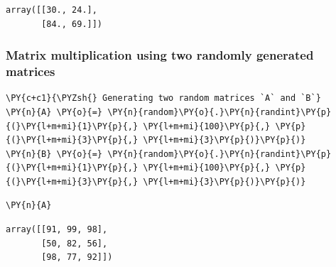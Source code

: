             \begin{tcolorbox}[breakable, size=fbox, boxrule=.5pt, pad at break*=1mm, opacityfill=0]
\begin{Verbatim}[commandchars=\\\{\}]
array([[30., 24.],
       [84., 69.]])
\end{Verbatim}
\end{tcolorbox}
        
    \hypertarget{matrix-multiplication-using-two-randomly-generated-matrices}{%
\subsubsection{Matrix multiplication using two randomly generated
matrices}\label{matrix-multiplication-using-two-randomly-generated-matrices}}

    \begin{tcolorbox}[breakable, size=fbox, boxrule=1pt, pad at break*=1mm,colback=cellbackground, colframe=cellborder]
\begin{Verbatim}[commandchars=\\\{\}]
\PY{c+c1}{\PYZsh{} Generating two random matrices `A` and `B`}
\PY{n}{A} \PY{o}{=} \PY{n}{random}\PY{o}{.}\PY{n}{randint}\PY{p}{(}\PY{l+m+mi}{1}\PY{p}{,} \PY{l+m+mi}{100}\PY{p}{,} \PY{p}{(}\PY{l+m+mi}{3}\PY{p}{,} \PY{l+m+mi}{3}\PY{p}{)}\PY{p}{)}
\PY{n}{B} \PY{o}{=} \PY{n}{random}\PY{o}{.}\PY{n}{randint}\PY{p}{(}\PY{l+m+mi}{1}\PY{p}{,} \PY{l+m+mi}{100}\PY{p}{,} \PY{p}{(}\PY{l+m+mi}{3}\PY{p}{,} \PY{l+m+mi}{3}\PY{p}{)}\PY{p}{)}
\end{Verbatim}
\end{tcolorbox}

    \begin{tcolorbox}[breakable, size=fbox, boxrule=1pt, pad at break*=1mm,colback=cellbackground, colframe=cellborder]
\begin{Verbatim}[commandchars=\\\{\}]
\PY{n}{A}
\end{Verbatim}
\end{tcolorbox}

            \begin{tcolorbox}[breakable, size=fbox, boxrule=.5pt, pad at break*=1mm, opacityfill=0]
\begin{Verbatim}[commandchars=\\\{\}]
array([[91, 99, 98],
       [50, 82, 56],
       [98, 77, 92]])
\end{Verbatim}
\end{tcolorbox}
        
